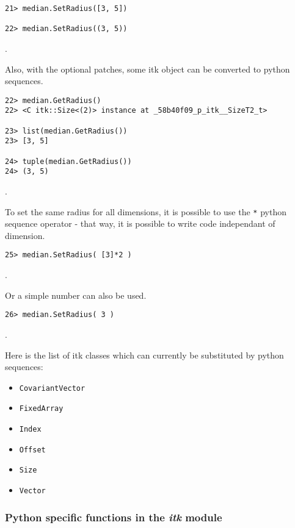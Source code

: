 \documentclass{InsightArticle}
\begin{document}
\begin{verbatim}
21> median.SetRadius([3, 5])

22> median.SetRadius((3, 5))
\end{verbatim}.

Also, with the optional patches, some itk object can be converted to python sequences.

\begin{verbatim}
22> median.GetRadius()
22> <C itk::Size<(2)> instance at _58b40f09_p_itk__SizeT2_t>

23> list(median.GetRadius())
23> [3, 5]

24> tuple(median.GetRadius())
24> (3, 5)
\end{verbatim}.

To set the same radius for all dimensions, it is possible to use the \verb$*$ python
sequence operator - that way, it is possible to write code independant of dimension.

\begin{verbatim}
25> median.SetRadius( [3]*2 )
\end{verbatim}.

Or a simple number can also be used.

\begin{verbatim}
26> median.SetRadius( 3 )
\end{verbatim}.

Here is the list of itk classes which can currently be substituted by python sequences:
\begin{itemize}
  \item \verb$CovariantVector$
  \item \verb$FixedArray$
  \item \verb$Index$
  \item \verb$Offset$
  \item \verb$Size$
  \item \verb$Vector$
\end{itemize}

     \subsubsection{Python specific functions in the {\em itk} module}
\end{document}
